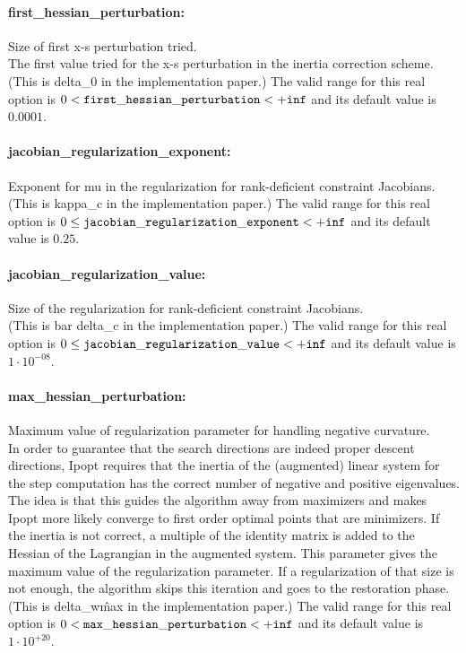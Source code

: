 \paragraph{first\_hessian\_perturbation:}\label{opt:first_hessian_perturbation} Size of first x-s perturbation tried. \\
 The first value tried for the x-s perturbation in the inertia correction scheme.(This is delta\_0 in the implementation paper.) The valid range for this real option is 
$0 <  {\tt first\_hessian\_perturbation } <  {\tt +inf}$
and its default value is $0.0001$.


\paragraph{jacobian\_regularization\_exponent:}\label{opt:jacobian_regularization_exponent} Exponent for mu in the regularization for rank-deficient constraint Jacobians. \\
 (This is kappa\_c in the implementation paper.) The valid range for this real option is 
$0 \le {\tt jacobian\_regularization\_exponent } <  {\tt +inf}$
and its default value is $0.25$.


\paragraph{jacobian\_regularization\_value:}\label{opt:jacobian_regularization_value} Size of the regularization for rank-deficient constraint Jacobians. \\
 (This is bar delta\_c in the implementation paper.) The valid range for this real option is 
$0 \le {\tt jacobian\_regularization\_value } <  {\tt +inf}$
and its default value is $1 \cdot 10^{-08}$.


\paragraph{max\_hessian\_perturbation:}\label{opt:max_hessian_perturbation} Maximum value of regularization parameter for handling negative curvature. \\
 In order to guarantee that the search directions are indeed proper descent directions, Ipopt requires that the inertia of the (augmented) linear system for the step computation has the correct number of negative and positive eigenvalues. The idea is that this guides the algorithm away from maximizers and makes Ipopt more likely converge to first order optimal points that are minimizers. If the inertia is not correct, a multiple of the identity matrix is added to the Hessian of the Lagrangian in the augmented system. This parameter gives the maximum value of the regularization parameter. If a regularization of that size is not enough, the algorithm skips this iteration and goes to the restoration phase. (This is delta\_w\^max in the implementation paper.) The valid range for this real option is 
$0 <  {\tt max\_hessian\_perturbation } <  {\tt +inf}$
and its default value is $1 \cdot 10^{+20}$.


